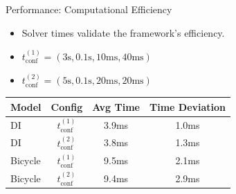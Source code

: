 \documentclass[shortpres,aspectratio=43]{beamer}
\begin{document}
\begin{frame}{Performance: Computational Efficiency}
  \begin{itemize}
    \item Solver times validate the framework's efficiency.
    \item $t_{\text{conf}}^{(1)} = (3\text{s}, 0.1\text{s}, 10\text{ms}, 40\text{ms})$
    \item $t_{\text{conf}}^{(2)} = (5\text{s}, 0.1\text{s}, 20\text{ms}, 20\text{ms})$
  \end{itemize}

  \centering
  \begin{tabular}{lccc}
    \toprule
    \textbf{Model} & \textbf{Config}         & \textbf{Avg Time} & \textbf{Time Deviation} \\
    \midrule
    DI             & $t_{\text{conf}}^{(1)}$ & 3.9ms             & 1.0ms                   \\
    DI             & $t_{\text{conf}}^{(2)}$ & 3.8ms             & 1.3ms                   \\
    Bicycle        & $t_{\text{conf}}^{(1)}$ & 9.5ms             & 2.1ms                   \\
    Bicycle        & $t_{\text{conf}}^{(2)}$ & 9.4ms             & 2.9ms                   \\
    \bottomrule
  \end{tabular}
\end{frame}
\end{document}
